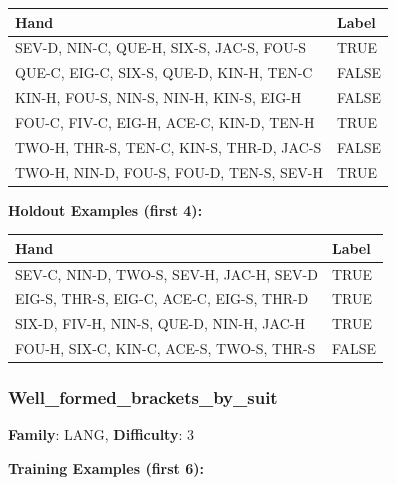 \documentclass[10pt,a4paper]{article}
\begin{document}
\begin{small}
\begin{tabular}{p{8cm}l}
\toprule
Hand & Label \\
\midrule
SEV-D, NIN-C, QUE-H, SIX-S, JAC-S, FOU-S & \textcolor{positive}{TRUE} \\
QUE-C, EIG-C, SIX-S, QUE-D, KIN-H, TEN-C & \textcolor{negative}{FALSE} \\
KIN-H, FOU-S, NIN-S, NIN-H, KIN-S, EIG-H & \textcolor{negative}{FALSE} \\
FOU-C, FIV-C, EIG-H, ACE-C, KIN-D, TEN-H & \textcolor{positive}{TRUE} \\
TWO-H, THR-S, TEN-C, KIN-S, THR-D, JAC-S & \textcolor{negative}{FALSE} \\
TWO-H, NIN-D, FOU-S, FOU-D, TEN-S, SEV-H & \textcolor{positive}{TRUE} \\
\bottomrule
\end{tabular}
\end{small}

\textbf{Holdout Examples (first 4):}

\begin{small}
\begin{tabular}{p{8cm}l}
\toprule
Hand & Label \\
\midrule
SEV-C, NIN-D, TWO-S, SEV-H, JAC-H, SEV-D & \textcolor{positive}{TRUE} \\
EIG-S, THR-S, EIG-C, ACE-C, EIG-S, THR-D & \textcolor{positive}{TRUE} \\
SIX-D, FIV-H, NIN-S, QUE-D, NIN-H, JAC-H & \textcolor{positive}{TRUE} \\
FOU-H, SIX-C, KIN-C, ACE-S, TWO-S, THR-S & \textcolor{negative}{FALSE} \\
\bottomrule
\end{tabular}
\end{small}

\vspace{0.5cm}

\subsubsection{Well\_formed\_brackets\_by\_suit}

\textbf{Family}: LANG, \textbf{Difficulty}: 3

\textbf{Training Examples (first 6):}
\end{document}

